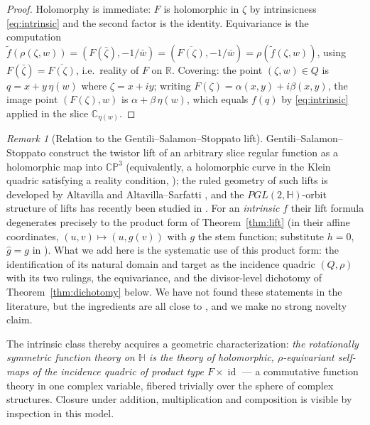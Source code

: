 \documentclass[11pt]{amsart}
\theoremstyle{plain}
\theoremstyle{definition}
\theoremstyle{remark}
\newtheorem{remark}[theorem]{Remark}
\newcommand{\HH}{\mathbb{H}}
\newcommand{\CC}{\mathbb{C}}
\newcommand{\RR}{\mathbb{R}}
\newcommand{\CP}{\mathbb{CP}}
\newcommand{\id}{\operatorname{id}}
\begin{document}
\begin{proof}
Holomorphy is immediate: $F$ is holomorphic in $\zeta$ by intrinsicness \eqref{eq:intrinsic} and
the second factor is the identity. Equivariance is the computation
$\tilde f(\rho(\zeta,w))=(F(\bar\zeta),-1/\bar w)=(\overline{F(\zeta)},-1/\bar w)
=\rho(\tilde f(\zeta,w))$, using $F(\bar\zeta)=\overline{F(\zeta)}$, i.e.\ reality of $F$ on $\RR$.
Covering: the point $(\zeta,w)\in Q$ is $q=x+y\,\eta(w)$ where $\zeta=x+iy$; writing
$F(\zeta)=\alpha(x,y)+i\beta(x,y)$, the image point $(F(\zeta),w)$ is
$\alpha+\beta\,\eta(w)$, which equals $f(q)$ by \eqref{eq:intrinsic} applied in the slice
$\CC_{\eta(w)}$.
\end{proof}

\begin{remark}[Relation to the Gentili--Salamon--Stoppato lift]\label{rem:GSS}
Gentili--Salamon--Stoppato \cite[Theorem~5.3 and eq.~(5.6)]{GSS2014} construct the twistor lift of
an arbitrary slice regular function as a holomorphic map into $\CP^3$ (equivalently, a holomorphic
curve in the Klein quadric satisfying a reality condition, \cite[Theorem~5.7]{GSS2014}); the ruled
geometry of such lifts is developed by Altavilla and Altavilla--Sarfatti
\cite{Altavilla2018,AltavillaSarfatti2019}, and the $PGL(2,\HH)$-orbit structure of lifts has
recently been studied in \cite{LiuMorenoShi2026}. For an \emph{intrinsic} $f$ their lift formula
degenerates precisely to the product form of Theorem~\ref{thm:lift} (in their affine coordinates,
$(u,v)\mapsto(u,g(v))$ with $g$ the stem function; substitute $h=0$, $\hat g=g$ in
\cite[eq.~(5.6)]{GSS2014}). What we add here is the systematic use of this product form: the
identification of its natural domain and target as the incidence quadric $(Q,\rho)$ with its two
rulings, the equivariance, and the divisor-level dichotomy of Theorem~\ref{thm:dichotomy} below. We
have not found these statements in the literature, but the ingredients are all close to
\cite{GSS2014,Altavilla2018,AltavillaSarfatti2019}, and we make no strong novelty claim.
\end{remark}

The intrinsic class thereby acquires a geometric characterization: \emph{the rotationally symmetric
function theory on $\HH$ is the theory of holomorphic, $\rho$-equivariant self-maps of the incidence
quadric of product type $F\times\id$} --- a commutative function theory in one complex variable,
fibered trivially over the sphere of complex structures. Closure under addition, multiplication and
composition is visible by inspection in this model.
\end{document}
